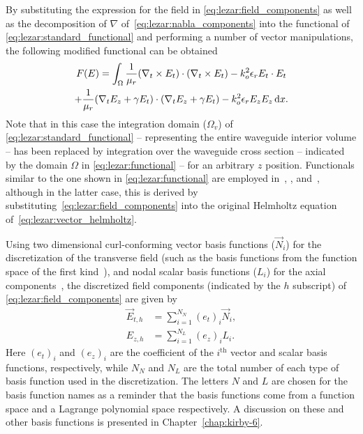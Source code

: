 By substituting the expression for the field in
\eqref{eq:lezar:field_components} as well as the decomposition of
$\nabla$ of~\eqref{eq:lezar:nabla_components} into the functional of
\eqref{eq:lezar:standard_functional} and performing a number of vector
manipulations, the following modified functional can be obtained
\begin{multline}
    \label{eq:lezar:functional}
    F({E}) = \int_{\Omega}\frac{1}{\mu_r}(\nabla_t\times{\ensuremath{{E}}_t})\cdot(\nabla_t\times{\ensuremath{{E}}_t})
    - k_o^2\epsilon_r{E}_t\cdot{\ensuremath{{E}}_t}\\
    +\frac{1}{\mu_r}(\nabla_t{E_z} + \gamma{E}_t)\cdot(\nabla_t{E_z} + \gamma{E}_t)
    -k_o^2\epsilon_r E_z{E_z} \, \mathrm{d}x.
\end{multline}
Note that in this case the integration domain ($\Omega_v$) of
\eqref{eq:lezar:standard_functional} -- representing the entire
waveguide interior volume -- has been replaced by integration over
the waveguide cross section -- indicated by the domain $\Omega$ in
\eqref{eq:lezar:functional} -- for an arbitrary $z$ position. Functionals
similar to the one shown in \eqref{eq:lezar:functional}
are employed in~\citet{LeeSunCendes1991}, \citet{Jin2002},
and~\citet{PelosiCoccioliSelleri1998}, although in the latter case,
this is derived by substituting~\eqref{eq:lezar:field_components} into
the original Helmholtz equation of~\eqref{eq:lezar:vector_helmholtz}.

Using two dimensional curl-conforming vector basis functions
($\vec{N}_i$) for the discretization of the transverse field (such as
the basis functions from the \nedelec{} function space of the first
kind~\citep{Nedelec1980, Webb1993, Monk2003}), and nodal scalar basis
functions ($L_i$) for the axial components~\citep{Jin2002,
PelosiCoccioliSelleri1998}, the discretized field components
(indicated by the $h$ subscript) of \eqref{eq:lezar:field_components}
are given by~\citep{Jin2002, PelosiCoccioliSelleri1998}
\begin{align}
  \label{eq:lezar:E_t_discretized}
  \vec{E}_{t,h} &= \sum_{i=1}^{N_N} (e_t)_i \vec{N}_i,\\
  \label{eq:lezar:E_z_discretized}
  E_{z,h} &= \sum_{i=1}^{N_L} (e_z)_i L_i.
\end{align}
Here $(e_t)_i$ and $(e_z)_i$ are the coefficient of the $i^\text{th}$
vector and scalar basis functions, respectively, while $N_N$ and $N_L$
are the total number of each type of basis function used in the
discretization. The letters $N$ and $L$ are chosen for the basis
function names as a reminder that the basis functions come from
a \nedelec{} function space and a Lagrange polynomial space
respectively. A discussion on these and other basis functions is
presented in Chapter~\ref{chap:kirby-6}.


